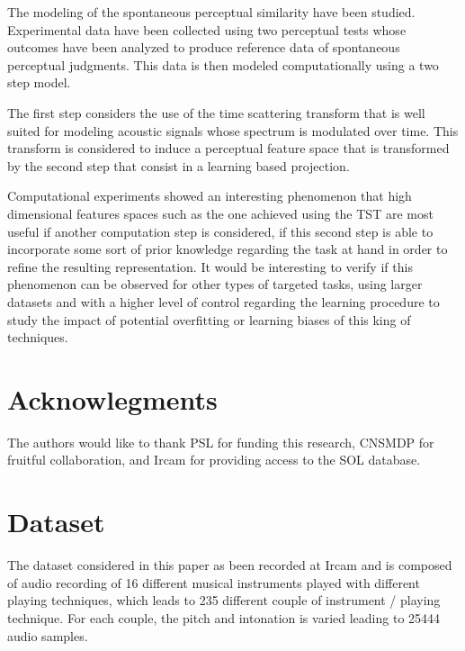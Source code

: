 \documentclass{article}
\begin{document}
The modeling of the spontaneous perceptual similarity have been studied. Experimental data have been collected using two perceptual tests whose outcomes have been analyzed to produce reference data of spontaneous perceptual judgments. This data is then modeled computationally using a two step model.

The first step considers the use of the time scattering transform that is well suited for modeling acoustic signals whose spectrum is modulated over time. This transform is considered to induce a perceptual feature space that is transformed by the second step that consist in a learning based projection.

Computational experiments showed an interesting phenomenon that high dimensional features spaces such as the one achieved using the TST are most useful if another computation step is considered, if this second step is able to incorporate some sort of prior knowledge regarding the task at hand in order to refine the resulting representation. It would be interesting to verify if this phenomenon can be observed for other types of targeted tasks, using larger datasets and with a higher level of control regarding the learning procedure to study the impact of potential overfitting or learning biases of this king of techniques.


\section*{Acknowlegments}

The authors would like to thank
PSL for funding this research,
CNSMDP for fruitful collaboration,
and Ircam for providing access to the SOL database.








\section{Dataset} \label{sec:dataset}

The dataset considered in this paper as been recorded at Ircam and is composed of audio recording of 16 different musical instruments played with different playing techniques, which leads to 235 different couple of instrument / playing technique. For each couple, the pitch and intonation is varied leading to 25444 audio samples.
\end{document}
